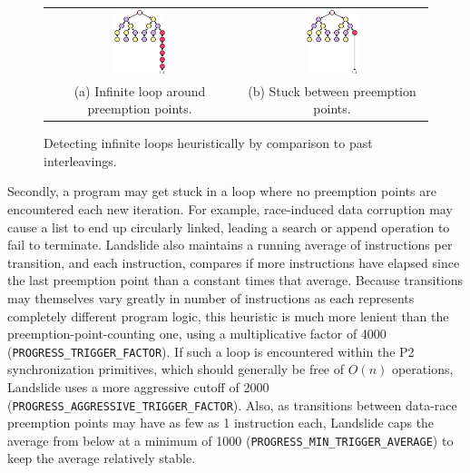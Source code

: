 \begin{figure}[t]
	\begin{center}
		\begin{tabular}{cc}
			\includegraphics[width=0.28\textwidth]{heuristic-livelock.pdf}
			&
			\includegraphics[width=0.28\textwidth]{heuristic-tightloop.pdf}
			\\
			(a) Infinite loop around preemption points.
			&
			(b) Stuck between preemption points.
		\end{tabular}
	\end{center}
	\caption{Detecting infinite loops heuristically by comparison to past interleavings.}
	\label{fig:heuristic-loop}
\end{figure}

Secondly, a program may get stuck in a loop where no preemption points are encountered each new iteration.
For example, race-induced data corruption may cause a list to end up circularly linked, %
leading a search or append operation to fail to terminate.
Landslide also maintains a running average of instructions per transition,
and each instruction, compares if more instructions have elapsed since the last preemption point
than a constant times that average.
Because transitions may themselves vary greatly in number of instructions as each represents completely different program logic,
this heuristic is much more lenient than the preemption-point-counting one,
using a multiplicative factor of 4000 ({\tt PROGRESS\_TRIGGER\_FACTOR}).
If such a loop is encountered within the P2 synchronization primitives,
which should generally be free of $O(n)$ operations,
Landslide uses a more aggressive cutoff of 2000
({\tt PROGRESS\_AGGRESSIVE\_TRIGGER\_FACTOR}).
Also, as transitions between data-race preemption points may have as few as 1 instruction each,
Landslide caps the average from below at a minimum of 1000 ({\tt PROGRESS\_MIN\_TRIGGER\_AVERAGE})
to keep the average relatively stable.

